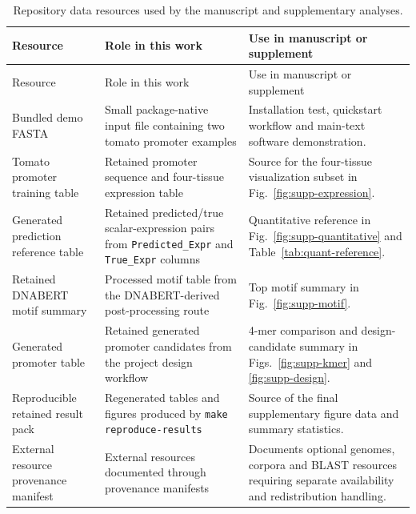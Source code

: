 \documentclass[10pt]{article}
\begin{document}

\begin{longtable}{L{0.22\textwidth}L{0.28\textwidth}L{0.39\textwidth}}
\caption{Repository data resources used by the manuscript and supplementary analyses.}\label{tab:data-resources}\\
\toprule
Resource & Role in this work & Use in manuscript or supplement \\
\midrule
\endfirsthead
\toprule
Resource & Role in this work & Use in manuscript or supplement \\
\midrule
\endhead
Bundled demo FASTA & Small package-native input file containing two tomato promoter examples & Installation test, quickstart workflow and main-text software demonstration. \\
Tomato promoter training table & Retained promoter sequence and four-tissue expression table & Source for the four-tissue visualization subset in Fig.~\ref{fig:supp-expression}. \\
Generated prediction reference table & Retained predicted/true scalar-expression pairs from \texttt{Predicted\_Expr} and \texttt{True\_Expr} columns & Quantitative reference in Fig.~\ref{fig:supp-quantitative} and Table~\ref{tab:quant-reference}. \\
Retained DNABERT motif summary & Processed motif table from the DNABERT-derived post-processing route & Top motif summary in Fig.~\ref{fig:supp-motif}. \\
Generated promoter table & Retained generated promoter candidates from the project design workflow & 4-mer comparison and design-candidate summary in Figs.~\ref{fig:supp-kmer} and \ref{fig:supp-design}. \\
Reproducible retained result pack & Regenerated tables and figures produced by \texttt{make reproduce-results} & Source of the final supplementary figure data and summary statistics. \\
External resource provenance manifest & External resources documented through provenance manifests & Documents optional genomes, corpora and BLAST resources requiring separate availability and redistribution handling. \\
\bottomrule
\end{longtable}
\end{document}
